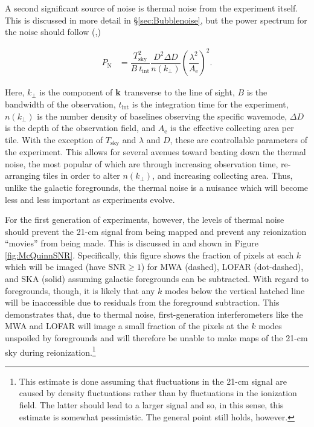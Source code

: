 A second significant source of noise is thermal noise from the experiment itself. This is discussed in more detail in \S \ref{sec:Bubblenoise}, but the power spectrum for the noise should follow (\citealt{McQuinn2006},\citealt{Furlanetto2006})

\begin{align}
P_{\text{N}} &= \dfrac{T_{\text{sky}}^{2}}{B\ t_{\text{int}}} \dfrac{D^{2}\Delta D}{n(k_{\perp})}\left( \dfrac{\lambda^{2}}{A_{\text{e}}} \right)^{2}.
\end{align}

Here, $k_{\perp}$ is the component of ${\bf k}$ transverse to the line of sight, $B$ is the bandwidth of the observation, $t_{\text{int}}$ is the integration time for the experiment, $n(k_{\perp})$ is the number density of baselines observing the specific wavemode, $\Delta D$ is the depth of the observation field, and $A_{\text{e}}$ is the effective collecting area per tile. With the exception of $T_{\text{sky}}$ and $\lambda$ and $D$, these are controllable parameters of the experiment. This allows for several avenues toward beating down the thermal noise, the most popular of which are through increasing observation time, re-arranging tiles in order to alter $n(k_{\perp})$, and increasing collecting area. Thus, unlike the galactic foregrounds, the thermal noise is a nuisance which will become less and less important as experiments evolve. 


For the first generation of experiments, however, the levels of thermal noise should prevent the 21-cm signal from being mapped and prevent any reionization ``movies'' from being made. This is discussed in \citet{McQuinn2006} and shown in Figure \ref{fig:McQuinnSNR}. Specifically, this figure shows the fraction of pixels at each $k$ which will be imaged (have $\text{SNR} \geq 1$) for MWA (dashed), LOFAR (dot-dashed), and SKA (solid) assuming galactic foregrounds can be subtracted. With regard to foregrounds, though, it is likely that any $k$ modes below the vertical hatched line will be inaccessible due to residuals from the foreground subtraction. This demonstrates that, due to thermal noise, first-generation interferometers like the MWA and LOFAR will image a small fraction of the pixels at the $k$ modes unspoiled by foregrounds and will therefore be unable to make maps of the 21-cm sky during reionization.\footnote{This estimate is done assuming that fluctuations in the 21-cm signal are caused by density fluctuations rather than by fluctuations in the ionization field. The latter should lead to a larger signal and so, in this sense, this estimate is somewhat pessimistic. The general point still holds, however.} 

